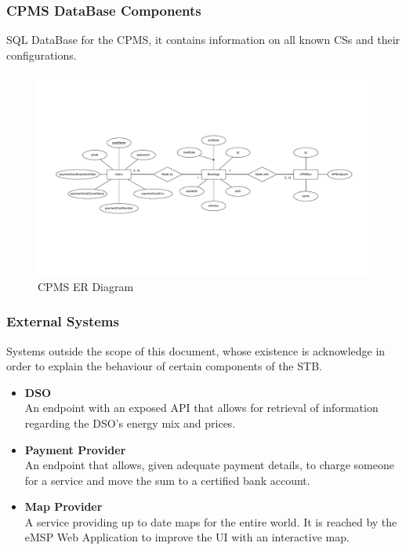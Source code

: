 \documentclass[11pt]{article}
\begin{document}
\subsubsection{CPMS DataBase Components}

SQL DataBase for the CPMS, it contains information on all known CSs and their configurations.

\begin{figure}[!ht]
    \centering
    \includegraphics[page={2}, trim=5cm 3.5cm 5cm 3.5cm, width=\linewidth, clip]{ERDiagrams.pdf}
    \caption{CPMS ER Diagram}
\end{figure}

\newpage

\subsubsection{External Systems}

Systems outside the scope of this document, whose existence is acknowledge in order to explain the behaviour of certain components of the STB.

\begin{itemize}
    \item \textbf{DSO} \\
        An endpoint with an exposed API that allows for retrieval of information regarding the DSO's energy mix and prices.
    \item \textbf{Payment Provider} \\
        An endpoint that allows, given adequate payment details, to charge someone for a service and move the sum to a certified bank account.
    \item \textbf{Map Provider} \\
        A service providing up to date maps for the entire world. It is reached by the eMSP Web Application to improve the UI with an interactive map.
\end{itemize}
\end{document}
